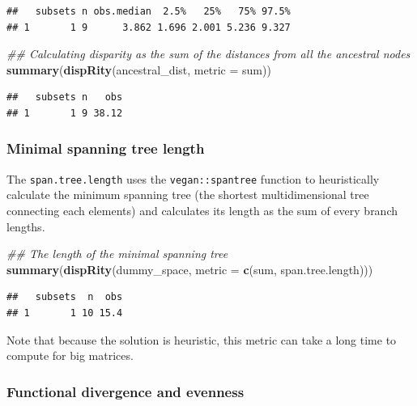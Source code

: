 \documentclass[]{book}
\newenvironment{Shaded}{\begin{snugshade}}{\end{snugshade}}
\newcommand{\CommentTok}[1]{\textcolor[rgb]{0.56,0.35,0.01}{\textit{#1}}}
\newcommand{\DataTypeTok}[1]{\textcolor[rgb]{0.13,0.29,0.53}{#1}}
\newcommand{\KeywordTok}[1]{\textcolor[rgb]{0.13,0.29,0.53}{\textbf{#1}}}
\newcommand{\NormalTok}[1]{#1}
\begin{document}
\begin{verbatim}
##   subsets n obs.median  2.5%   25%   75% 97.5%
## 1       1 9      3.862 1.696 2.001 5.236 9.327
\end{verbatim}

\begin{Shaded}
\begin{Highlighting}[]
\CommentTok{## Calculating disparity as the sum of the distances from all the ancestral nodes}
\KeywordTok{summary}\NormalTok{(}\KeywordTok{dispRity}\NormalTok{(ancestral_dist, }\DataTypeTok{metric =}\NormalTok{ sum))}
\end{Highlighting}
\end{Shaded}

\begin{verbatim}
##   subsets n   obs
## 1       1 9 38.12
\end{verbatim}

\hypertarget{minimal-spanning-tree-length}{%
\subsubsection{Minimal spanning tree length}\label{minimal-spanning-tree-length}}

The \texttt{span.tree.length} uses the \texttt{vegan::spantree} function to heuristically calculate the minimum spanning tree (the shortest multidimensional tree connecting each elements) and calculates its length as the sum of every branch lengths.

\begin{Shaded}
\begin{Highlighting}[]
\CommentTok{## The length of the minimal spanning tree}
\KeywordTok{summary}\NormalTok{(}\KeywordTok{dispRity}\NormalTok{(dummy_space, }\DataTypeTok{metric =} \KeywordTok{c}\NormalTok{(sum, span.tree.length)))}
\end{Highlighting}
\end{Shaded}

\begin{verbatim}
##   subsets  n  obs
## 1       1 10 15.4
\end{verbatim}

Note that because the solution is heuristic, this metric can take a long time to compute for big matrices.

\hypertarget{functional-divergence-and-evenness}{%
\subsubsection{Functional divergence and evenness}\label{functional-divergence-and-evenness}}
\end{document}

